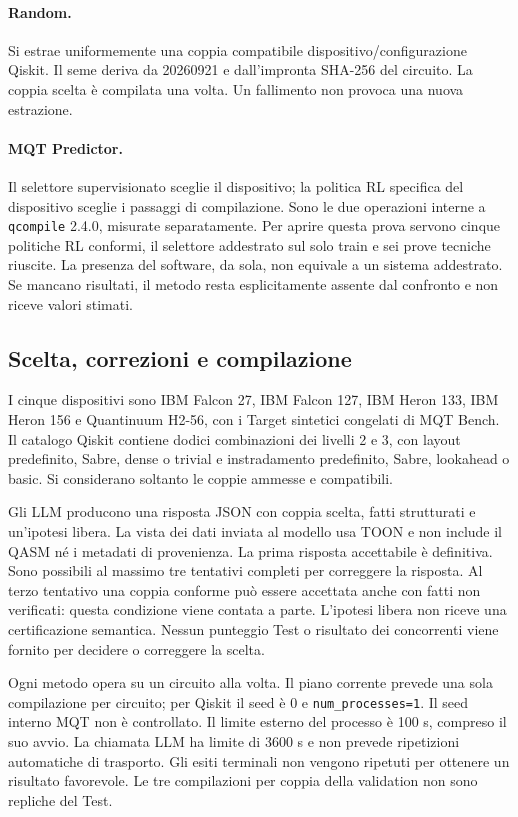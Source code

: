 \paragraph{Random.}
Si estrae uniformemente una coppia compatibile dispositivo/configurazione Qiskit.
Il seme deriva da 20260921 e dall'impronta SHA-256 del circuito. La coppia scelta
è compilata una volta. Un fallimento non provoca una nuova estrazione.

\paragraph{MQT Predictor.}
Il selettore supervisionato sceglie il dispositivo; la politica RL specifica del
dispositivo sceglie i passaggi di compilazione. Sono le due operazioni interne
a \texttt{qcompile} 2.4.0, misurate separatamente. Per aprire questa prova servono
cinque politiche RL conformi, il selettore addestrato sul solo train e sei prove
tecniche riuscite. La presenza del software, da sola, non equivale a un sistema
addestrato. Se mancano risultati, il metodo resta esplicitamente assente dal
confronto e non riceve valori stimati.

\subsection{Scelta, correzioni e compilazione}
I cinque dispositivi sono IBM Falcon 27, IBM Falcon 127, IBM Heron 133,
IBM Heron 156 e Quantinuum H2-56, con i Target sintetici congelati di MQT Bench.
Il catalogo Qiskit contiene dodici combinazioni dei livelli 2 e 3, con layout
predefinito, Sabre, dense o trivial e instradamento predefinito, Sabre, lookahead
o basic. Si considerano soltanto le coppie ammesse e compatibili.

Gli LLM producono una risposta JSON con coppia scelta, fatti strutturati e
un'ipotesi libera. La vista dei dati inviata al modello usa TOON e non include
il QASM né i metadati di provenienza. La prima risposta accettabile è definitiva.
Sono possibili al massimo tre tentativi completi per correggere la risposta.
Al terzo tentativo una coppia conforme può essere accettata anche con fatti non
verificati: questa condizione viene contata a parte. L'ipotesi libera non riceve
una certificazione semantica. Nessun punteggio Test o risultato dei concorrenti
viene fornito per decidere o correggere la scelta.

Ogni metodo opera su un circuito alla volta. Il piano corrente prevede una sola
compilazione per circuito; per Qiskit il seed è 0 e \texttt{num\_processes=1}.
Il seed interno MQT non è controllato. Il limite esterno del processo è 100 s,
compreso il suo avvio. La chiamata LLM ha limite di 3600 s e non prevede ripetizioni
automatiche di trasporto. Gli esiti terminali non vengono ripetuti per ottenere
un risultato favorevole. Le tre compilazioni per coppia della validation non
sono repliche del Test.

